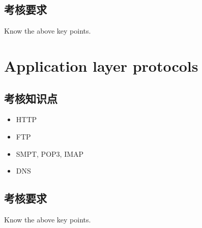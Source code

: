 \documentclass[11pt]{article}
\begin{document}
\subsection{考核要求}
\label{sec-4-2}
Know the above key points.
\section{Application layer protocols}
\label{sec-5}
\subsection{考核知识点}
\label{sec-5-1}
\begin{itemize}
\item HTTP
\item FTP
\item SMPT, POP3, IMAP
\item DNS
\end{itemize}
\subsection{考核要求}
\label{sec-5-2}
Know the above key points.
\end{document}
